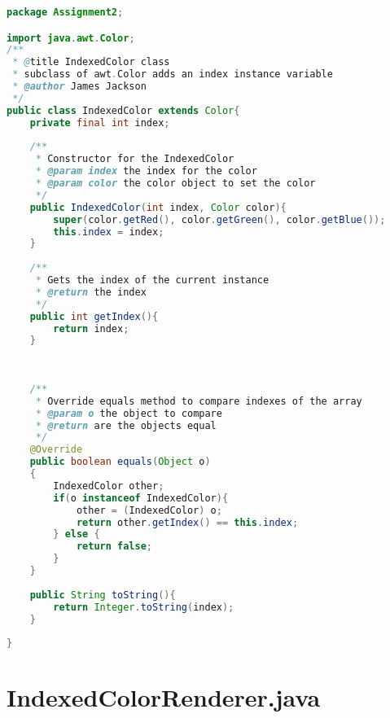 \documentclass[pdftex,a4paper,10pt,titlepage]{article}
\begin{document}
\begin{lstlisting}[language=java, breaklines=true]
package Assignment2;

import java.awt.Color;
/**
 * @title IndexedColor class 
 * subclass of awt.Color adds an index instance variable
 * @author James Jackson
 */
public class IndexedColor extends Color{
    private final int index;
    
    /**
     * Constructor for the IndexedColor
     * @param index the index for the color
     * @param color the color object to set the color
     */
    public IndexedColor(int index, Color color){
        super(color.getRed(), color.getGreen(), color.getBlue());
        this.index = index;
    }
    
    /**
     * Gets the index of the current instance
     * @return the index
     */
    public int getIndex(){
        return index;
    }
  
    
    
    /**
     * Override equals method to compare indexes of the array
     * @param o the object to compare
     * @return are the objects equal
     */
    @Override
    public boolean equals(Object o)
    {
        IndexedColor other;
        if(o instanceof IndexedColor){
            other = (IndexedColor) o;
            return other.getIndex() == this.index;
        } else {
            return false;
        }
    }
    
    public String toString(){
        return Integer.toString(index);
    }
    
}

\end{lstlisting}


\section{IndexedColorRenderer.java}
\end{document}
